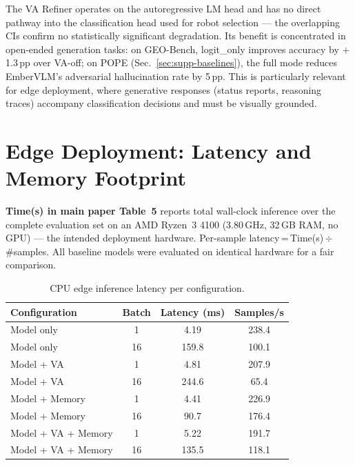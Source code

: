\documentclass[runningheads]{llncs}
\begin{document}
The VA Refiner operates on the autoregressive LM head and has no direct pathway into the classification head used for robot selection — the overlapping CIs confirm no statistically significant degradation. Its benefit is concentrated in open-ended generation tasks: on GEO-Bench, logit\_only improves accuracy by $+$1.3\,pp over VA-off; on POPE (Sec.~\ref{sec:supp-baselines}), the full mode reduces EmberVLM's adversarial hallucination rate by 5\,pp. This is particularly relevant for edge deployment, where generative responses (status reports, reasoning traces) accompany classification decisions and must be visually grounded.

\section{Edge Deployment: Latency and Memory Footprint}
\label{sec:supp-latency}

\noindent\textbf{Time(s) in main paper Table~5} reports total wall-clock inference over the complete evaluation set on an AMD Ryzen~3 4100 (3.80\,GHz, 32\,GB RAM, no GPU) — the intended deployment hardware. Per-sample latency\,=\,Time(s)\,$\div$\,\#samples. All baseline models were evaluated on identical hardware for a fair comparison.

\begin{table}[ht]
\centering
\caption{CPU edge inference latency per configuration.}
\label{tab:latency}
\begin{tabular}{lccc}
\toprule
Configuration & Batch & Latency (ms) & Samples/s \\
\midrule
Model only          & 1  &   4.19 & 238.4 \\
Model only          & 16 & 159.8  & 100.1 \\
Model + VA          & 1  &   4.81 & 207.9 \\
Model + VA          & 16 & 244.6  &  65.4 \\
Model + Memory      & 1  &   4.41 & 226.9 \\
Model + Memory      & 16 &  90.7  & 176.4 \\
Model + VA + Memory & 1  &   5.22 & 191.7 \\
Model + VA + Memory & 16 & 135.5  & 118.1 \\
\bottomrule
\end{tabular}
\end{table}
\end{document}
